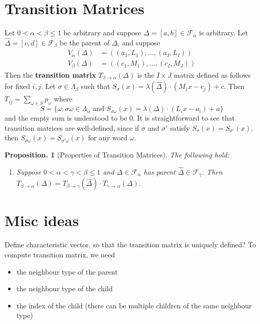 \documentclass[11pt, a4paper]{memoir}
\theoremstyle{change}
\newtheorem{proposition}[theorem]{Proposition.}
\theoremstyle{plain}
\theoremstyle{nonumberplain}
\numberwithin{equation}{section}
\begin{document}
\section{Transition Matrices}
Let $0<\alpha<\beta\leq 1$ be arbitrary and suppose $\Delta=[a,b]\in\mathcal{F}_\alpha$ is arbitrary.
Let $\widehat\Delta=[c,d]\in\mathcal{F}_\beta$ be the parent of $\Delta$, and suppose
\begin{align*}
    V_\alpha(\Delta) &= ((a_1,L_1),\ldots,(a_I,L_I))\\
    V_\beta(\Delta) &= ((c_1,M_1),\ldots,(c_I,M_J))
\end{align*}
Then the \textbf{transition matrix} $T_{\beta\to\alpha}(\Delta)$ is the $I\times J$ matrix defined as follows for fixed $i,j$.
Let $\sigma\in\Lambda_\beta$ such that $S_\sigma(x)=\lambda(\widehat\Delta)\cdot (M_jx-c_j)+c$.
Then $T_{ij}=\sum_{\omega\in S}p_\omega$ where
\begin{equation*}
    S=\{\omega:\sigma\omega\in\Lambda_\alpha\text{ and }S_{\sigma\omega}(x)=\lambda(\Delta)\cdot(L_ix-a_i)+a\}
\end{equation*}
and the empty sum is understood to be 0.
It is straightforward to see that transition matrices are well-defined, since if $\sigma$ and $\sigma'$ satisfy $S_\sigma(x)=S_{\sigma'}(x)$, then $S_{\sigma\omega}(x)=S_{\sigma'\omega}(x)$ for any word $\omega$.
\begin{proposition}[Properties of Transition Matrices]
    The following hold:
    \begin{enumerate}[nl,r]
        \item Suppose $0<\alpha<\gamma<\beta\leq 1$ and $\Delta\in\mathcal{F}_\alpha$ has parent $\widehat\Delta\in\mathcal{F}_\gamma$.
            Then $T_{\beta\to\alpha}(\Delta)=T_{\beta\to\gamma}(\widehat\Delta)\cdot T_{\gamma\to\alpha}(\Delta)$.
    \end{enumerate}
\end{proposition}
\section{Misc ideas}
Define characteristic vector, so that the transition matrix is uniquely defined?
To compute transition matrix, we need
\begin{itemize}
    \item the neighbour type of the parent
    \item the neighbour type of the child
    \item the index of the child (there can be multiple children of the same neighbour type)
\end{itemize}
\end{document}
